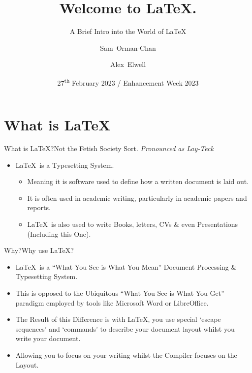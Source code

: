 \documentclass{beamer}
\title[] %
{Welcome to \LaTeX.}
\subtitle
{A Brief Intro into the World of \LaTeX} %
\author[] %
{Sam~Orman-Chan \and Alex~Elwell}
\institute[] %
{%
 University of Lincoln School of Computer Science}
\date[] %
{27\textsuperscript{th} February 2023 / Enhancement Week 2023}
\begin{document}
\begin{frame}
  \titlepage
\end{frame}



\section{What is \LaTeX}

\begin{frame}{What is LaTeX?}{Not the Fetish Society Sort.}
\emph{Pronounced as Lay-Teck}
  \begin{itemize}
  \item
   \LaTeX~is a Typesetting System.
  \begin{itemize}\item Meaning it is software used to define how a written document is laid out.
  \item It is often used in academic writing, particularly in academic papers and reports.
  \item \LaTeX~is also used to write Books, letters, CVs \& even Presentations (Including this One).
   \end{itemize}
  \end{itemize}
\end{frame}

\begin{frame}{Why?}{Why use \LaTeX?}
\begin{itemize}
\item \LaTeX~is a ``What You See is What You Mean'' Document Processing \& Typesetting System.
\item This is opposed to the Ubiquitous ``What You See is What You Get'' paradigm employed by tools like Microsoft Word or LibreOffice.
\item The Result of this Difference is with \LaTeX, you use special `escape sequences' and `commands' to describe your document layout whilst you write your document. 
\item Allowing you to focus on your writing whilst the Compiler focuses on the Layout.
\end{itemize}
\end{frame}
\end{document}
